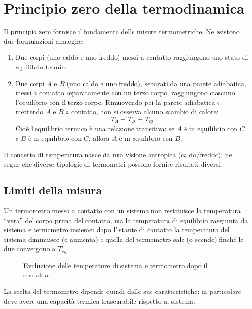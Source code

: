 \documentclass[11pt, a4paper, openright]{book}
\theoremstyle{plain}
\theoremstyle{definition}
\theoremstyle{remark}
\begin{document}
\section{Principio zero della termodinamica}
Il principio zero fornisce il fondamento delle misure termometriche. Ne esistono due formulazioni analoghe:
\begin{enumerate}
    \item Due corpi (uno caldo e uno freddo) messi a contatto raggiungono uno stato di equilibrio termico.
    \item Due corpi $A$ e $B$ (uno caldo e uno freddo), separati da una parete adiabatica, messi a contatto separatamente con un terzo corpo, raggiungono ciascuno l'equilibrio con il terzo corpo. Rimuovendo poi la parete adiabatica e mettendo $A$ e $B$ a contatto, non si osserva alcuno scambio di calore:
    \begin{equation}
        T_A = T_B = T_{eq}
    \end{equation}
    Cioè l'equilibrio termico è una relazione transitiva: se $A$ è in equilibrio con $C$ e $B$ è in equilibrio con $C$, allora $A$ è in equilibrio con $B$.
\end{enumerate}

Il concetto di temperatura nasce da una visione antropica (caldo/freddo); ne segue che diverse tipologie di termometri possono fornire risultati diversi.

\subsection{Limiti della misura}
Un termometro messo a contatto con un sistema non restituisce la temperatura ``vera'' del corpo prima del contatto, ma la temperatura di equilibrio raggiunta da sistema e termometro insieme: dopo l'istante di contatto la temperatura del sistema diminuisce (o aumenta) e quella del termometro sale (o scende) finché le due convergono a $T_{eq}$.

\begin{figure}[H]
    \centering
    \caption{Evoluzione delle temperature di sistema e termometro dopo il contatto.}
\end{figure}
La scelta del termometro dipende quindi dalle sue caratteristiche: in particolare deve avere una capacità termica trascurabile rispetto al sistema.
\end{document}

